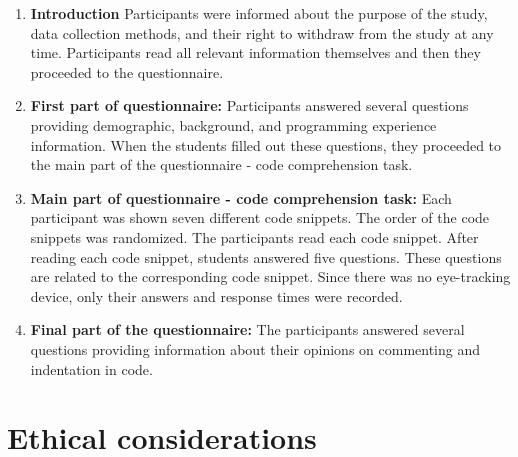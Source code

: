 \begin{enumerate}
    \item \textbf{Introduction} Participants were informed about the purpose of the study, data collection methods, and their right to withdraw from the study at any time. Participants read all relevant information themselves and then they proceeded to the questionnaire.
    
    \item \textbf{First part of questionnaire:}
    Participants answered several questions providing demographic, background, and programming experience information. When the students filled out these questions, they proceeded to the main part of the questionnaire - code comprehension task.

    \item \textbf{Main part of questionnaire - code comprehension task:} Each participant was shown seven different code snippets. The order of the code snippets was randomized. The participants read each code snippet. After reading each code snippet, students answered five questions. These questions are related to the corresponding code snippet. Since there was no eye-tracking device, only their answers and response times were recorded.

    \item \textbf{Final part of the questionnaire:}
    The participants answered several questions providing information about their opinions on commenting and indentation in code.
\end{enumerate}




\section{Ethical considerations}

